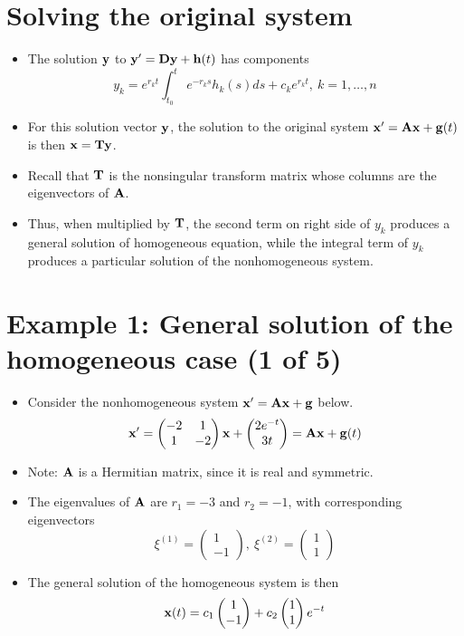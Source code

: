 \documentclass[11pt,a4paper]{article}
\begin{document}
	\section*{Solving the original system}
	\begin{itemize}
		\item The solution $\vb{y}$ to $\vb{y}^\prime = \vb{Dy} + \vb{h}(t)$ has components
		$$
		y_k = e^{r_kt}\int_{t_0}^t\ e^{-r_ks}h_k(s)ds + c_ke^{r_kt},\ k=1,\ldots,n
		$$
		\item For this solution vector $\vb{y}$, the solution to the original system $\vb{x}^\prime = \vb{Ax} + \vb{g}(t)$ is then $\vb{x} = \vb{Ty}$.
		\item Recall that $\vb{T}$ is the nonsingular transform matrix whose columns are the eigenvectors of $\vb{A}$.
		\item Thus, when multiplied by $\vb{T}$, the second term on right side of $y_k$ produces a general solution of homogeneous equation, while the integral term of $y_k$ produces a particular solution of the nonhomogeneous system. 
	\end{itemize}
	\section*{Example 1: General solution of the homogeneous case (1 of 5)}
	\begin{itemize}
		\item Consider the nonhomogeneous system $\vb{x}^\prime = \vb{Ax} + \vb{g}$ below.
		$$
		\vb{x}^\prime =
		\begin{pmatrix}
			-2 & 1\\
			1 & -2
		\end{pmatrix}\vb{x} +
		\begin{pmatrix}
			2e^{-t}\\
			3t
		\end{pmatrix} = \vb{Ax} + \vb{g}(t)
		$$
		\item Note: $\vb{A}$ is a Hermitian matrix, since it is real and symmetric.
		\item The eigenvalues of $\vb{A}$ are $r_1 = -3$ and $r_2 = -1$, with corresponding eigenvectors
		$$
		\xi^{(1)} =
		\begin{pmatrix}
			1\\
			-1
		\end{pmatrix},\ \xi^{(2)} =
		\begin{pmatrix}
			1\\
			1
		\end{pmatrix}
		$$
		\item The general solution of the homogeneous system is then
		$$
		\vb{x}(t) = c_1
		\begin{pmatrix}
			1\\
			-1
		\end{pmatrix} + c_2
		\begin{pmatrix}
			1\\
			1
		\end{pmatrix}e^{-t}
		$$
	\end{itemize}
\end{document}
